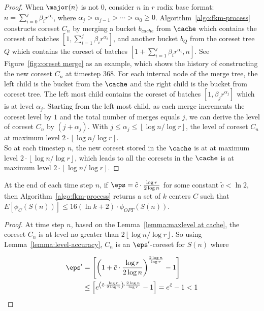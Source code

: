 {\begin{proof}
When $\major(n)$ is not $0$, consider $n$ in $r$ radix base format: $n=\sum_{i=0}^j\beta_ir^{\alpha_i}$, where $\alpha_j>\alpha_{j-1}>\cdots>\alpha_0\ge 0$. Algorithm~\ref{algo:fkm-process} constructs coreset $C_n$ by merging a bucket $b_{cache}$ from $\cache$ which contains the coreset of batches $\left[ 1, \sum_{i=1}^j\beta_ir^{\alpha_i} \right]$, and another bucket $b_Q$ from the coreset tree $Q$ which contains the coreset of batches $\left[ 1+\sum_{i=1}^j\beta_ir^{\alpha_i}, n \right]$. 
See Figure~\ref{fig:coreset merge} as an example, which shows the history of constructing the new coreset $C_n$ at timestep $368$. For each internal node of the merge tree, the left child is the bucket from the $\cache$ and the right child is the bucket from coreset tree.  
The left most child contains the coreset of batches $\left[1, \beta_jr^{\alpha_j}\right]$ which is at level $\alpha_j$. Starting from the left most child, as each merge increments the coreset level by $1$ and the total number of merges equals $j$, we can derive the level of coreset $C_n$ by $\left(j+\alpha_j\right)$. With $j \le \alpha_j \le \left\lfloor \log n/\log r \right\rfloor$, the level of coreset $C_n$ at maximum level $2 \cdot \left\lfloor \log n/\log r \right\rfloor$. \\

So at each timestep $n$, the new coreset stored in the $\cache$ is at at maximum level $2 \cdot \left\lfloor \log n/\log r \right\rfloor$, which leads to all the coresets in the $\cache$ is at maximum level $2 \cdot \left\lfloor \log n/\log r \right\rfloor$.
\end{proof}


\begin{lemma}
\label{lemma:final accuracy}
At the end of each time step $n$, if $\eps=\tilde{c}\cdot\frac{\log r}{2\log n}$ for some constant $\tilde{c}<\ln 2$, 
then Algorithm~\ref{algo:fkm-process} returns a set of $k$ centers $C$ such that 
$E\left[\phi_C(S(n))\right] \le 16(\ln k+2) \cdot \phi_{OPT}(S(n))$.
\end{lemma}
\begin{proof}
At time step $n$, based on the Lemma~\ref{lemma:maxlevel at cache}, the coreset $C_n$ is at level no greater than 
$2 \left\lfloor\log n/\log r \right\rfloor$. 
So using Lemma~\ref{lemma:level-accuracy}, $C_n$ is an $\eps'$-coreset for $S(n)$ where 

\[ \begin{split} 
\eps' &= \left[ \left(1 + \tilde{c}\cdot\frac{\log r}{2\log n}\right)^{\frac{2\log n}{\log r}}-1 \right] \\
&\le \left[ e^{\left(\tilde{c}\cdot \frac{\log r}{2\log n}\right)\cdot \frac{2\log n}{\log r}}-1 \right] = e^{\tilde{c}}-1 < 1
\end{split} 
\]


\end{proof}}
